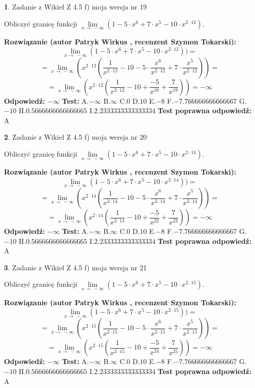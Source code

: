\documentclass[12pt, a4paper]{article}
\theoremstyle{definition} %
\newtheorem{zad}{}
\newcommand{\zadStart}[1]{\begin{zad}#1\newline}
\newcommand{\zadStop}{\end{zad}}
\newcommand{\rozwStart}[2]{\noindent \textbf{Rozwiązanie (autor #1 , recenzent #2): }\newline}
\newcommand{\rozwStop}{\newline}
\newcommand{\odpStart}{\noindent \textbf{Odpowiedź:}\newline}
\newcommand{\odpStop}{\newline}
\newcommand{\testStart}{\noindent \textbf{Test:}\newline}
\newcommand{\testStop}{\newline}
\newcommand{\kluczStart}{\noindent \textbf{Test poprawna odpowiedź:}\newline}
\newcommand{\kluczStop}{\newline}
\begin{document}
\zadStart{Zadanie z Wikieł Z 4.5 f) moja wersja nr 19}


Obliczyć granicę funkcji  $\lim\limits_{x\to\ -\infty}(1 - 5 \cdot x^{6}+7 \cdot x^{5}- 10 \cdot x^{2\cdot12})$.
\zadStop
\rozwStart{Patryk Wirkus}{Szymon Tokarski}
$$\lim\limits_{x\to\ -\infty}(1 - 5 \cdot x^{6}+7 \cdot x^{5}- 10 \cdot x^{2\cdot12}))=$$
$$=\lim\limits_{x\to\ -\infty}(x^{2\cdot12}(\frac{1}{x^{2\cdot12}}-10 -5 \cdot \frac{x^{6}}{x^{2\cdot12}}+7 \cdot \frac{x^{5}}{x^{2\cdot12}}))=$$
$$=\lim\limits_{x\to\ -\infty}(x^{2\cdot12}(\frac{1}{x^{2\cdot12}}-10 + \frac{-5}{x^{18}}+ \frac{7}{x^{19}}))=-\infty$$
\rozwStop
\odpStart
$-\infty$
\odpStop
\testStart
A.$-\infty$ B.$\infty$ C.$0$ D.$10$ E.$-8$
F.$-7.766666666666667$ G.$-10$
H.$0.5666666666666665$
I.$2.2333333333333334$
\testStop
\kluczStart
A
\kluczStop



\zadStart{Zadanie z Wikieł Z 4.5 f) moja wersja nr 20}


Obliczyć granicę funkcji  $\lim\limits_{x\to\ -\infty}(1 - 5 \cdot x^{6}+7 \cdot x^{5}- 10 \cdot x^{2\cdot14})$.
\zadStop
\rozwStart{Patryk Wirkus}{Szymon Tokarski}
$$\lim\limits_{x\to\ -\infty}(1 - 5 \cdot x^{6}+7 \cdot x^{5}- 10 \cdot x^{2\cdot14}))=$$
$$=\lim\limits_{x\to\ -\infty}(x^{2\cdot14}(\frac{1}{x^{2\cdot14}}-10 -5 \cdot \frac{x^{6}}{x^{2\cdot14}}+7 \cdot \frac{x^{5}}{x^{2\cdot14}}))=$$
$$=\lim\limits_{x\to\ -\infty}(x^{2\cdot14}(\frac{1}{x^{2\cdot14}}-10 + \frac{-5}{x^{22}}+ \frac{7}{x^{23}}))=-\infty$$
\rozwStop
\odpStart
$-\infty$
\odpStop
\testStart
A.$-\infty$ B.$\infty$ C.$0$ D.$10$ E.$-8$
F.$-7.766666666666667$ G.$-10$
H.$0.5666666666666665$
I.$2.2333333333333334$
\testStop
\kluczStart
A
\kluczStop



\zadStart{Zadanie z Wikieł Z 4.5 f) moja wersja nr 21}


Obliczyć granicę funkcji  $\lim\limits_{x\to\ -\infty}(1 - 5 \cdot x^{6}+7 \cdot x^{5}- 10 \cdot x^{2\cdot15})$.
\zadStop
\rozwStart{Patryk Wirkus}{Szymon Tokarski}
$$\lim\limits_{x\to\ -\infty}(1 - 5 \cdot x^{6}+7 \cdot x^{5}- 10 \cdot x^{2\cdot15}))=$$
$$=\lim\limits_{x\to\ -\infty}(x^{2\cdot15}(\frac{1}{x^{2\cdot15}}-10 -5 \cdot \frac{x^{6}}{x^{2\cdot15}}+7 \cdot \frac{x^{5}}{x^{2\cdot15}}))=$$
$$=\lim\limits_{x\to\ -\infty}(x^{2\cdot15}(\frac{1}{x^{2\cdot15}}-10 + \frac{-5}{x^{24}}+ \frac{7}{x^{25}}))=-\infty$$
\rozwStop
\odpStart
$-\infty$
\odpStop
\testStart
A.$-\infty$ B.$\infty$ C.$0$ D.$10$ E.$-8$
F.$-7.766666666666667$ G.$-10$
H.$0.5666666666666665$
I.$2.2333333333333334$
\testStop
\kluczStart
A
\kluczStop
\end{document}
